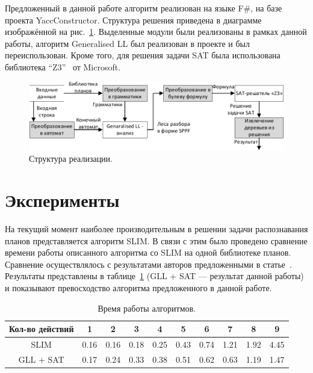 \documentclass[14pt]{matmex-diploma-custom}
\begin{document}
    Предложенный в данной работе алгоритм реализован на языке F\#, на базе проекта YaccConstructor. 
    Структура решения приведена в диаграмме изображённой на рис.~\ref{fig:diagram}.
    Выделенные модули были реализованы в рамках данной работы, алгоритм Generalised LL 
    был реализован в проекте и был переиспользован. Кроме того, для решения задачи SAT была использована библиотека
    ``Z3''~\cite{Z3} от Microsoft.
    \begin{figure}[H]
    	\centering
    	
    	\includegraphics[scale=1.03]{pictures/diagram.pdf}
    	\caption{Структура реализации.}
    	\label{fig:diagram}
    \end{figure}

    \section{Эксперименты}
    На текущий момент наиболее производительным в решении задачи распознавания планов представляется алгоритм SLIM.
    В связи с этим было проведено сравнение времени работы описанного алгоритма со SLIM на одной библиотеке планов.
    Сравнение осуществлялось с результатами авторов предложенными в
    статье~\cite{mirsky2017slim}. Результаты представлены в таблице~\ref{expTable} (GLL + SAT --- результат данной работы) и показывают
    превосходство алгоритма предложенного в данной работе.
    
    \begin{table}[ht]   
    	\begin{center}
    		\begin{tabular}{ | c | c | c | c | c | c | c | c | c | c |  }
    			\hline
    			Кол-во действий & 1& 2& 3& 4& 5& 6& 7& 8& 9 \\
    			\hline
    			SLIM & 0.16 & 0.16 & 0.18 & 0.25 & 0.43 & 0.74 & 1.21 & 1.92 & 4.45 \\
   				GLL + SAT & 0.17 & 0.24 & 0.33& 0.38& 0.51& 0.62& 0.63& 1.19& 1.47\\
   				\hline
    		\end{tabular}
    	\end{center}
    	\caption{Время работы алгоритмов.}
    	\label{expTable}
    \end{table}
    
\end{document}
